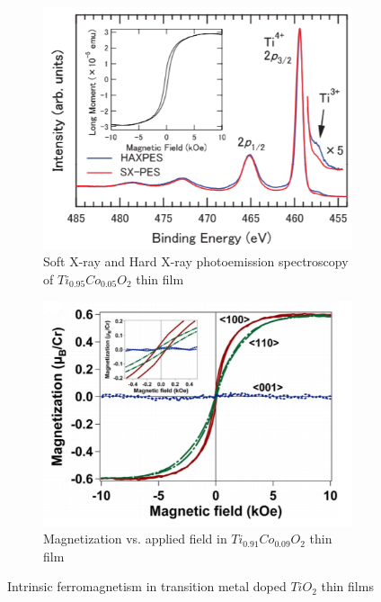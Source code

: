 \documentclass[main.tex]{subfiles}
\begin{document}
\begin{figure}[!htb]
\centering
	\begin{subfigure}[h]{0.42\textwidth}
		\centering
		\includegraphics[width=\linewidth]{ohtsuki}
  		\caption{Soft X-ray and Hard X-ray photoemission spectroscopy of $Ti_{0.95}Co_{0.05}O_{2}$ thin film \cite{ohtsuki2011role}}
	\end{subfigure}
	\begin{subfigure}[h]{0.5\textwidth}
  		\centering
  		\includegraphics[width=\linewidth]{kaspar}
  		\caption{Magnetization vs. applied field in $Ti_{0.91}Co_{0.09}O_{2}$ thin film \cite{kaspar2006ferromagnetism}}
	\end{subfigure}
\caption{Intrinsic ferromagnetism in transition metal doped $TiO_{2}$ thin films} 
\label{fig:fig}

\end{figure}
\FloatBarrier
\end{document}
